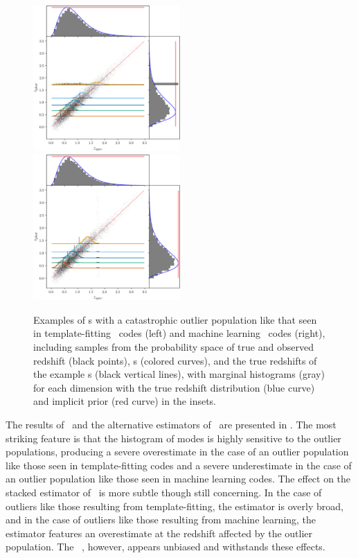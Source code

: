 \begin{figure}
	\includegraphics[width=0.5\textwidth]{figures/chippr/thesis_eout_mega_scatter.png}
	\includegraphics[width=0.5\textwidth]{figures/chippr/thesis_rout_mega_scatter.png}
	\caption{
		Examples of \pzpdf s with a catastrophic outlier population like that seen in template-fitting \pzpdf\ codes (left) and machine learning \pzpdf\ codes (right), including samples from the probability space of true and observed redshift (black points), \pzpdf s (colored curves), and the true redshifts of the example \pzpdf s (black vertical lines), with marginal histograms (gray) for each dimension with the true redshift distribution (blue curve) and implicit prior (red curve) in the insets.
	}
\end{figure}

The results of \Chippr\ and the alternative estimators of \nz\ are presented in .
The most striking feature is that the histogram of modes is highly sensitive to the outlier populations, producing a severe overestimate in the case of an outlier population like those seen in template-fitting codes and a severe underestimate in the case of an outlier population like those seen in machine learning codes.
The effect on the stacked estimator of \nz\ is more subtle though still concerning.
In the case of outliers like those resulting from template-fitting, the estimator is overly broad, and in the case of outliers like those resulting from machine learning, the estimator features an overestimate at the redshift affected by the outlier population.
The \Chippr\ \mmle, however, appears unbiased and withstands these effects.

